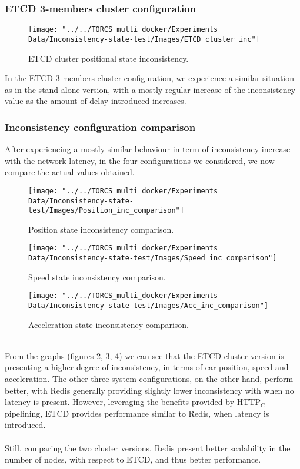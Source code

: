 \subsubsection{ETCD 3-members cluster configuration}
\begin{figure}[h!]
	\centering
	\texttt{[image: "../../TORCS\_multi\_docker/Experiments Data/Inconsistency-state-test/Images/ETCD\_cluster\_inc"]}
	\caption[ETCD cluster positional state inconsistency]{ETCD cluster positional state inconsistency.}
	\label{fig:etcd-cluster-inconsistency}
\end{figure}
In the ETCD 3-members cluster configuration, we experience a similar situation as in the stand-alone version, with a mostly regular increase of the inconsistency value as the amount of delay introduced increases.

\subsubsection{Inconsistency configuration comparison}
After experiencing a mostly similar behaviour in term of inconsistency increase with the network latency, in the four configurations we considered, we now compare the actual values obtained.
\begin{figure}[h!]
	\centering
	\texttt{[image: "../../TORCS\_multi\_docker/Experiments Data/Inconsistency-state-test/Images/Position\_inc\_comparison"]}
	\caption[Position state inconsistency comparison]{Position state inconsistency comparison.}
	\label{fig:position-inconsistency-comparison}
\end{figure}
\begin{figure}[h!]
	\centering
	\texttt{[image: "../../TORCS\_multi\_docker/Experiments Data/Inconsistency-state-test/Images/Speed\_inc\_comparison"]}
	\caption[Speed state inconsistency comparison]{Speed state inconsistency comparison.}
	\label{fig:speed-inconsistency-comparison}
\end{figure}
\begin{figure}[h!]
	\centering
	\texttt{[image: "../../TORCS\_multi\_docker/Experiments Data/Inconsistency-state-test/Images/Acc\_inc\_comparison"]}
	\caption[Acceleration state inconsistency comparison]{Acceleration state inconsistency comparison.}
	\label{fig:acceleration-inconsistency-comparison}
\end{figure}
\\ From the graphs (figures \ref{fig:position-inconsistency-comparison}, \ref{fig:speed-inconsistency-comparison}, \ref{fig:acceleration-inconsistency-comparison}) we can see that the ETCD cluster version is presenting a higher degree of inconsistency, in terms of car position, speed and acceleration. The other three system configurations, on the other hand, perform better, with Redis generally providing slightly lower inconsistency with when no latency is present. However, leveraging the benefits provided by HTTP$_G$ pipelining, ETCD provides performance similar to Redis, when latency is introduced. \\ \\
Still, comparing the two cluster versions, Redis present better scalability in the number of nodes, with respect to ETCD, and thus better performance.